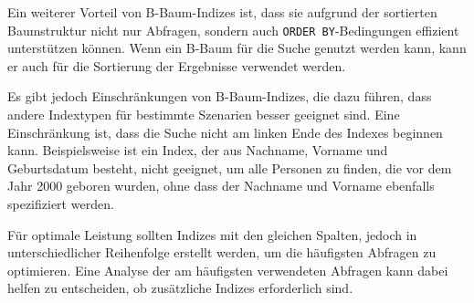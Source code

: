 Ein weiterer Vorteil von B-Baum-Indizes ist, dass sie aufgrund der sortierten Baumstruktur nicht nur Abfragen, sondern auch \texttt{ORDER BY}-Bedingungen effizient unterstützen können.
Wenn ein B-Baum für die Suche genutzt werden kann, kann er auch für die Sortierung der Ergebnisse verwendet werden.

Es gibt jedoch Einschränkungen von B-Baum-Indizes, die dazu führen, dass andere Indextypen für bestimmte Szenarien besser geeignet sind.
Eine Einschränkung ist, dass die Suche nicht am linken Ende des Indexes beginnen kann.
Beispielsweise ist ein Index, der aus Nachname, Vorname und Geburtsdatum besteht, nicht geeignet, um alle Personen zu finden, die vor dem Jahr 2000 geboren wurden, ohne dass der Nachname und Vorname ebenfalls spezifiziert werden.

Für optimale Leistung sollten Indizes mit den gleichen Spalten, jedoch in unterschiedlicher Reihenfolge erstellt werden, um die häufigsten Abfragen zu optimieren.
Eine Analyse der am häufigsten verwendeten Abfragen kann dabei helfen zu entscheiden, ob zusätzliche Indizes erforderlich sind.

